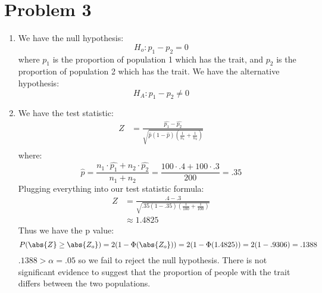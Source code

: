 \documentclass{article}
\begin{document}
\section*{Problem 3}
\begin{enumerate}
\item We have the null hypothesis: \\
\[
H_o: p_1 - p_2 = 0
\]
where $p_1$ is the proportion of population 1 which has the trait, and $p_2$ is the proportion of population 2 which has the trait. We have the alternative hypothesis: \\
\[
H_A: p_1 - p_2 \neq 0
\]
\item We have the test statistic: \\
\begin{align*}
Z &= \frac{\hat{p_1} - \hat{p_2}}{\sqrt{\hat{p}(1 - \hat{p})(\frac{1}{n_1} + \frac{1}{n_2})}} \\
\end{align*}
where: \\
\[
\hat{p} = \frac{n_1 \cdot \hat{p_1} + n_2 \cdot \hat{p_2}}{n_1 + n_2} = \frac{100 \cdot .4 + 100 \cdot .3}{200} = .35
\]
Plugging everything into our test statistic formula: \\
\begin{align*}
Z &= \frac{.4 - .3}{\sqrt{.35(1 - .35)(\frac{1}{100} + \frac{1}{100})}} \\
&\approx 1.4825
\end{align*}
Thus we have the p value: \\
\[
P(\abs{Z} \geq \abs{Z_o}) = 2(1 - \Phi(\abs{Z_o})) = 2(1 - \Phi(1.4825)) = 2(1 - .9306) = .1388
\]
$.1388 > \alpha = .05$ so we fail to reject the null hypothesis. There is not significant evidence to suggest that the proportion of people with the trait differs between the two populations. \\
\end{enumerate}
\end{document}
